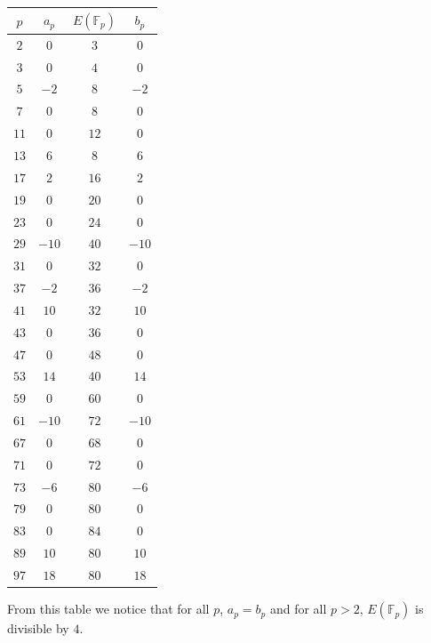 \documentclass[12 pt, letterpaper]{hmcpset}
\begin{document}
\begin{solution}
	\begin{center}
		\begin{tabular}{| c | c | c | c |}
			\hline
			$p$ & $a_{p}$ & $E(\mathbb{F}_{p}) $ & $b_{p}$ \\ \hline \hline
			$2$ & $0$ & $3$ & $0$ \\ \hline
			$3$ & $0$ & $4$ & $0$ \\ \hline
			$5$ & $-2$ & $8$ & $-2$ \\ \hline
			$7$ & $0$ & $8$ & $0$ \\ \hline
			$11$ & $0$ & $12$ & $0$ \\ \hline
			$13$ & $6$ & $8$ & $6$ \\ \hline
			$17$ & $2$ & $16$ & $2$ \\ \hline
			$19$ & $0$ & $20$ & $0$ \\ \hline
			$23$ & $0$ & $24$ & $0$ \\ \hline
			$29$ & $-10$ & $40$ & $-10$ \\ \hline
			$31$ & $0$ & $32$ & $0$ \\ \hline
			$37$ & $-2$ & $36$ & $-2$ \\ \hline
			$41$ & $10$ & $32$ & $10$ \\ \hline
			$43$ & $0$ & $36$ & $0$  \\ \hline
			$47$ & $0$ & $48$ & $0$ \\ \hline
			$53$ & $14$ & $40$ & $14$ \\ \hline
			$59$ & $0$ & $60$ & $0$ \\ \hline
			$61$ & $-10$ & $72$ & $-10$ \\ \hline
			$67$ & $0$ & $68$ & $0$ \\ \hline
			$71$ & $0$ & $72$ & $0$ \\ \hline
			$73$ & $-6$ & $80$ & $-6$ \\ \hline
			$79$ & $0$ & $80$ & $0$ \\ \hline
			$83$ & $0$ & $84$ & $0$ \\ \hline
			$89$ & $10$ & $80$ & $10$ \\ \hline
			$97$ & $18$ & $80$ & $18$ \\ \hline
		\end{tabular}
	\end{center}

	From this table we notice that for all $p$, $a_{p} = b_{p}$ and for all $p > 2$, $E(\mathbb{F}_{p})$ is divisible by $4$.
\end{solution}
\end{document}

